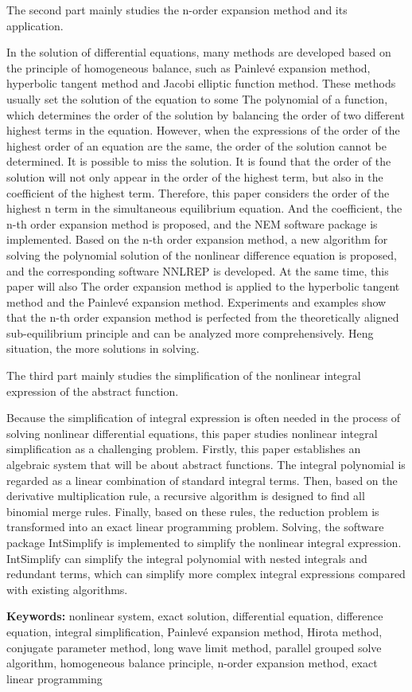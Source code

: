 The second part mainly studies the n-order expansion method and its application.

In the solution of differential equations, many methods are developed based on the principle of homogeneous balance, such as Painlevé expansion method, hyperbolic tangent method and Jacobi elliptic function method. These methods usually set the solution of the equation to some The polynomial of a function, which determines the order of the solution by balancing the order of two different highest terms in the equation. However, when the expressions of the order of the highest order of an equation are the same, the order of the solution cannot be determined. It is possible to miss the solution. It is found that the order of the solution will not only appear in the order of the highest term, but also in the coefficient of the highest term. Therefore, this paper considers the order of the highest n term in the simultaneous equilibrium equation. And the coefficient, the n-th order expansion method is proposed, and the NEM software package is implemented. Based on the n-th order expansion method, a new algorithm for solving the polynomial solution of the nonlinear difference equation is proposed, and the corresponding software NNLREP is developed. At the same time, this paper will also The order expansion method is applied to the hyperbolic tangent method and the Painlevé expansion method. Experiments and examples show that the n-th order expansion method is perfected from the theoretically aligned sub-equilibrium principle and can be analyzed more comprehensively. Heng situation, the more solutions in solving.

The third part mainly studies the simplification of the nonlinear integral expression of the abstract function.

Because the simplification of integral expression is often needed in the process of solving nonlinear differential equations, this paper studies nonlinear integral simplification as a challenging problem. Firstly, this paper establishes an algebraic system that will be about abstract functions. The integral polynomial is regarded as a linear combination of standard integral terms. Then, based on the derivative multiplication rule, a recursive algorithm is designed to find all binomial merge rules. Finally, based on these rules, the reduction problem is transformed into an exact linear programming problem. Solving, the software package IntSimplify is implemented to simplify the nonlinear integral expression. IntSimplify can simplify the integral polynomial with nested integrals and redundant terms, which can simplify more complex integral expressions compared with existing algorithms.

\bigskip
\noindent\textbf{ Keywords:}
nonlinear system, exact solution, differential equation, difference equation, integral simplification, Painlevé expansion method, Hirota method, conjugate parameter method, long wave limit method, parallel grouped solve algorithm, homogeneous balance principle, n-order expansion method, exact linear programming
